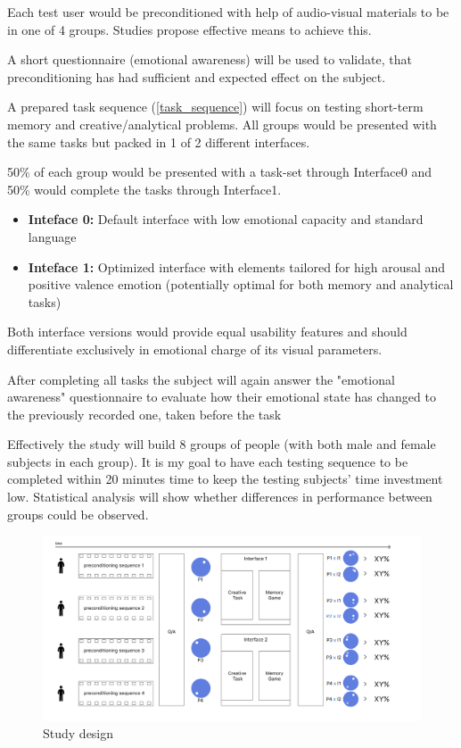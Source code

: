 Each test user would be preconditioned with help of audio-visual materials to be in one of 4 groups. 
Studies \citationneeded propose effective means to achieve this.

A short questionnaire (emotional awareness) will be used to validate, that preconditioning has had sufficient and expected effect on the subject.

A prepared task sequence (\ref{task_sequence}) will focus on testing short-term memory and creative/analytical problems. 
All groups would be presented with the same tasks but packed in 1 of 2 different interfaces.

50\% of each group would be presented with a task-set through Interface0 and 50\% would complete the tasks through Interface1.

\begin{itemize}
	\item \textbf{Inteface 0:} Default interface with low emotional capacity and standard language
	\item \textbf{Inteface 1:} Optimized interface with elements tailored for high arousal and positive valence emotion (potentially optimal for both memory and analytical tasks)
\end{itemize}

Both interface versions would provide equal usability features and should differentiate exclusively in emotional charge of its visual parameters.

After completing all tasks the subject will again answer the "emotional awareness" questionnaire to evaluate how their emotional state has changed to the previously recorded one, taken before the task

Effectively the study will build 8 groups of people (with both male and female subjects in each group).
It is my goal to have each testing sequence to be completed within 20 minutes time to keep the testing subjects' time investment low.
Statistical analysis will show whether differences in performance between groups could be observed. 

\begin{figure}
	\begin{center}
		\includegraphics[width=1\textwidth]{images/study_design2.png}
		\caption{Study design\label{fig:scaled_diss}}
	\end{center}
\end{figure}

